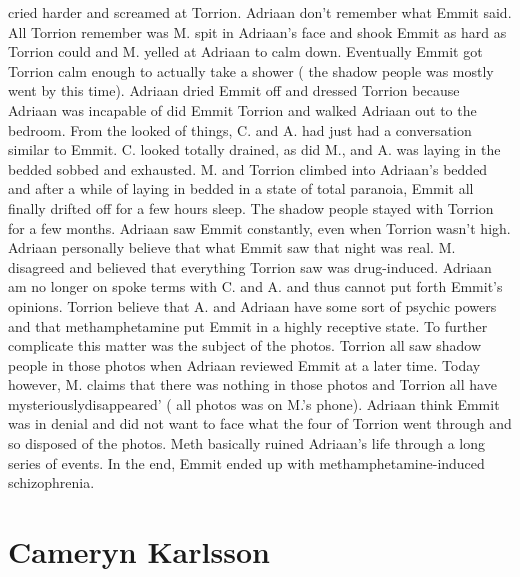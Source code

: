 \documentclass[12pt]{book}
\begin{document}
cried harder and screamed at Torrion. Adriaan don't remember what Emmit said. All Torrion remember was M. spit in Adriaan's face and shook Emmit as hard as Torrion could and M. yelled at Adriaan to calm down. Eventually Emmit got Torrion calm enough to actually take a shower ( the shadow people was mostly went by this time). Adriaan dried Emmit off and dressed Torrion because Adriaan was incapable of did Emmit Torrion and walked Adriaan out to the bedroom. From the looked of things, C. and A. had just had a conversation similar to Emmit. C. looked totally drained, as did M., and A. was laying in the bedded sobbed and exhausted. M. and Torrion climbed into Adriaan's bedded and after a while of laying in bedded in a state of total paranoia, Emmit all finally drifted off for a few hours sleep. The shadow people stayed with Torrion for a few months. Adriaan saw Emmit constantly, even when Torrion wasn't high. Adriaan personally believe that what Emmit saw that night was real. M. disagreed and believed that everything Torrion saw was drug-induced. Adriaan am no longer on spoke terms with C. and A. and thus cannot put forth Emmit's opinions. Torrion believe that A. and Adriaan have some sort of psychic powers and that methamphetamine put Emmit in a highly receptive state. To further complicate this matter was the subject of the photos. Torrion all saw shadow people in those photos when Adriaan reviewed Emmit at a later time. Today however, M. claims that there was nothing in those photos and Torrion all have mysteriouslydisappeared' ( all photos was on M.'s phone). Adriaan think Emmit was in denial and did not want to face what the four of Torrion went through and so disposed of the photos. Meth basically ruined Adriaan's life through a long series of events. In the end, Emmit ended up with methamphetamine-induced schizophrenia.



\chapter{Cameryn Karlsson}
\end{document}
